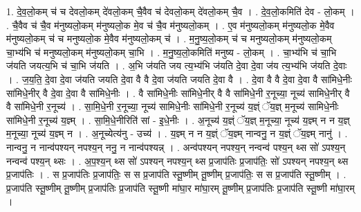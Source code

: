\documentclass[17pt]{extarticle}
\begin{document}
1. दे॒व॒लो॒कम् च॑ च देवलो॒कम् दे॑वलो॒कम् चै॒वैव च॑ देवलो॒कम् दे॑वलो॒कम् चै॒व । . दे॒व॒लो॒कमिति॑ देव - लो॒कम् । . चै॒वैव च॑ चै॒व म॑नुष्यलो॒कम् म॑नुष्यलो॒क मे॒व च॑ चै॒व म॑नुष्यलो॒कम् । . ए॒व म॑नुष्यलो॒कम् म॑नुष्यलो॒क मे॒वैव म॑नुष्यलो॒कम् च॑ च मनुष्यलो॒क मे॒वैव म॑नुष्यलो॒कम् च॑ । . म॒नु॒ष्य॒लो॒कम् च॑ च मनुष्यलो॒कम् म॑नुष्यलो॒कम् चा॒भ्य॑भि च॑ मनुष्यलो॒कम् म॑नुष्यलो॒कम् चा॒भि । . म॒नु॒ष्य॒लो॒कमिति॑ मनुष्य - लो॒कम् । . चा॒भ्य॑भि च॑ चा॒भि ज॑यति जयत्य॒भि च॑ चा॒भि ज॑यति । . अ॒भि ज॑यति जय त्य॒भ्य॑भि ज॑यति दे॒वा दे॒वा ज॑य त्य॒भ्य॑भि ज॑यति दे॒वाः । . ज॒य॒ति॒ दे॒वा दे॒वा ज॑यति जयति दे॒वा वै वै दे॒वा ज॑यति जयति दे॒वा वै । . दे॒वा वै वै दे॒वा दे॒वा वै सा॑मिधे॒नीः सा॑मिधे॒नीर् वै दे॒वा दे॒वा वै सा॑मिधे॒नीः । . वै सा॑मिधे॒नीः सा॑मिधे॒नीर् वै वै सा॑मिधे॒नी र॒नूच्या॒ नूच्य॑ सामिधे॒नीर् वै वै सा॑मिधे॒नी र॒नूच्य॑ । . सा॒मि॒धे॒नी र॒नूच्या॒ नूच्य॑ सामिधे॒नीः सा॑मिधे॒नी र॒नूच्य॑ य॒ज्ञ्ं ॅय॒ज्ञ् म॒नूच्य॑ सामिधे॒नीः सा॑मिधे॒नी र॒नूच्य॑ य॒ज्ञ्म् । . सा॒मि॒धे॒नीरिति॑ सां - इ॒धे॒नीः । . अ॒नूच्य॑ य॒ज्ञ्ं ॅय॒ज्ञ् म॒नूच्या॒ नूच्य॑ य॒ज्ञ्म् न न य॒ज्ञ् म॒नूच्या॒ नूच्य॑ य॒ज्ञ्म् न । . अ॒नूच्येत्य॑नु - उच्य॑ । . य॒ज्ञ्म् न न य॒ज्ञ्ं ॅय॒ज्ञ्म् नान्वनु॒ न य॒ज्ञ्ं ॅय॒ज्ञ्म् नानु॑ । . नान्वनु॒ न नान्व॑पश्यन् नपश्य॒न् ननु॒ न नान्व॑पश्यन्न् । . अन्व॑पश्यन् नपश्य॒न् नन्वन्व॑ पश्य॒न् थ्स सो॑ ऽपश्य॒न् नन्वन्व॑ पश्य॒न् थ्सः । . अ॒प॒श्य॒न् थ्स सो॑ ऽपश्यन् नपश्य॒न् थ्स प्र॒जाप॑तिः प्र॒जाप॑तिः॒ सो॑ ऽपश्यन् नपश्य॒न् थ्स प्र॒जाप॑तिः । . स प्र॒जाप॑तिः प्र॒जाप॑तिः॒ स स प्र॒जाप॑ति स्तू॒ष्णीम् तू॒ष्णीम् प्र॒जाप॑तिः॒ स स प्र॒जाप॑ति स्तू॒ष्णीम् । . प्र॒जाप॑ति स्तू॒ष्णीम् तू॒ष्णीम् प्र॒जाप॑तिः प्र॒जाप॑ति स्तू॒ष्णी मा॑घा॒र मा॑घा॒रम् तू॒ष्णीम् प्र॒जाप॑तिः प्र॒जाप॑ति स्तू॒ष्णी मा॑घा॒रम् । \newline
\end{document}

